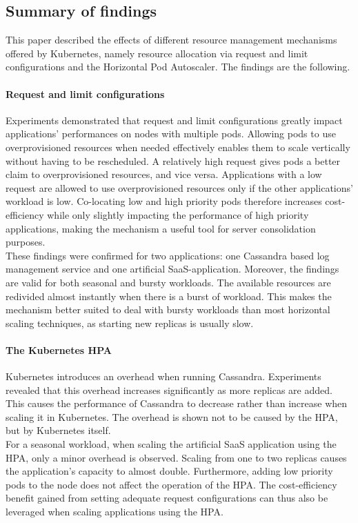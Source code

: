 \subsection{Summary of findings}
This paper described the effects of different resource management mechanisms offered by Kubernetes, namely resource allocation via request and limit configurations and the Horizontal Pod Autoscaler. The findings are the following.

\paragraph{Request and limit configurations} 
Experiments demonstrated that request and limit configurations greatly impact applications' performances on nodes with multiple pods. Allowing pods to use overprovisioned resources when needed effectively enables them to scale vertically without having to be rescheduled. A relatively high request gives pods a better claim to overprovisioned resources, and vice versa. Applications with a low request are allowed to use overprovisioned resources only if the other applications' workload is low. Co-locating low and high priority pods therefore increases cost-efficiency while only slightly impacting the performance of high priority applications, making the mechanism a useful tool for server consolidation purposes. \\

These findings were confirmed for two applications: one Cassandra based log management service and one artificial SaaS-application. Moreover, the findings are valid for both seasonal and bursty workloads. The available resources are redivided almost instantly when there is a burst of workload. This makes the mechanism better suited to deal with bursty workloads than most horizontal scaling techniques, as starting new replicas is usually slow. 

\paragraph{The Kubernetes HPA}
Kubernetes introduces an overhead when running Cassandra. Experiments revealed that this overhead increases significantly as more replicas are added. This causes the performance of Cassandra to decrease rather than increase when scaling it in Kubernetes. The overhead is shown not to be caused by the HPA, but by Kubernetes itself. \\
\newpage
For a seasonal workload, when scaling the artificial SaaS application using the HPA, only a minor overhead is observed. Scaling from one to two replicas causes the application's capacity to almost double. Furthermore, adding low priority pods to the node does not affect the operation of the HPA. The cost-efficiency benefit gained from setting adequate request configurations can thus also be leveraged when scaling applications using the HPA. \\


